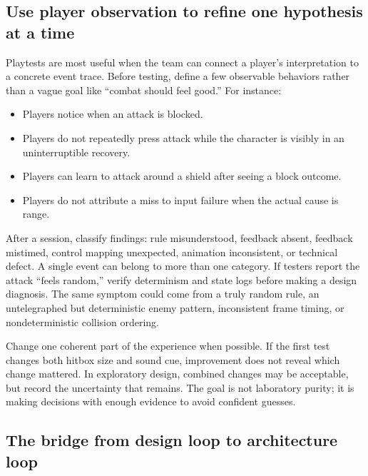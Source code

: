 \subsection{Use player observation to refine one hypothesis at a time}\label{06-engine-ii-ch041-use-player-observation-to-refine-one-hypothesis-at-a-time}

\hypertarget{06-engine-ii-ch041-use-player-observation-to-refine-one-hypothesis-at-a-time}{}

Playtests are most useful when the team can connect a player's interpretation to a concrete event trace. Before testing, define a few observable behaviors rather than a vague goal like ``combat should feel good.'' For instance:

\begin{itemize}
\tightlist
\item
  Players notice when an attack is blocked.
\item
  Players do not repeatedly press attack while the character is visibly in an uninterruptible recovery.
\item
  Players can learn to attack around a shield after seeing a block outcome.
\item
  Players do not attribute a miss to input failure when the actual cause is range.
\end{itemize}

After a session, classify findings: rule misunderstood, feedback absent, feedback mistimed, control mapping unexpected, animation inconsistent, or technical defect. A single event can belong to more than one category. If testers report the attack ``feels random,'' verify determinism and state logs before making a design diagnosis. The same symptom could come from a truly random rule, an untelegraphed but deterministic enemy pattern, inconsistent frame timing, or nondeterministic collision ordering.

Change one coherent part of the experience when possible. If the first test changes both hitbox size and sound cue, improvement does not reveal which change mattered. In exploratory design, combined changes may be acceptable, but record the uncertainty that remains. The goal is not laboratory purity; it is making decisions with enough evidence to avoid confident guesses.

\subsection{The bridge from design loop to architecture loop}\label{06-engine-ii-ch041-the-bridge-from-design-loop-to-architecture-loop}

